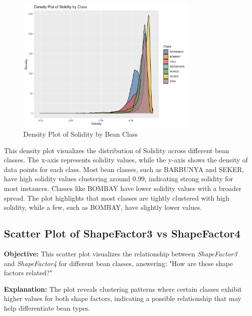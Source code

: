 \documentclass[a4paper,12pt]{article}
\begin{document}
\begin{figure}[H]
    \centering
    \includegraphics[width=0.8\textwidth]{graphs/density_solidity.png}
    \caption{Density Plot of Solidity by Bean Class}
    \label{fig:density_solidity}
\end{figure}
This density plot visualizes the distribution of Solidity across different bean classes. The x-axis represents solidity values, while the y-axis shows the density of data points for each class. Most bean classes, such as BARBUNYA and SEKER, have high solidity values clustering around 0.99, indicating strong solidity for most instances. Classes like BOMBAY have lower solidity values with a broader spread. The plot highlights that most classes are tightly clustered with high solidity, while a few, such as BOMBAY, have slightly lower values.

\newpage

\subsection{Scatter Plot of ShapeFactor3 vs ShapeFactor4}
\noindent\textbf{Objective:} This scatter plot visualizes the relationship between \textit{ShapeFactor3} and \textit{ShapeFactor4} for different bean classes, answering: "How are these shape factors related?"

\noindent\textbf{Explanation:} The plot reveals clustering patterns where certain classes exhibit higher values for both shape factors, indicating a possible relationship that may help differentiate bean types.
\end{document}

